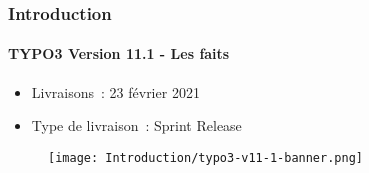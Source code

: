 %

\begin{frame}[fragile]
	\frametitle{Introduction}
	\framesubtitle{TYPO3 Version 11.1 - Les faits}

	\begin{itemize}
		\item Livraisons~: 23 février 2021
		\item Type de livraison~: Sprint Release
	\end{itemize}

	\begin{figure}
		\texttt{[image: Introduction/typo3-v11-1-banner.png]}
	\end{figure}

\end{frame}

